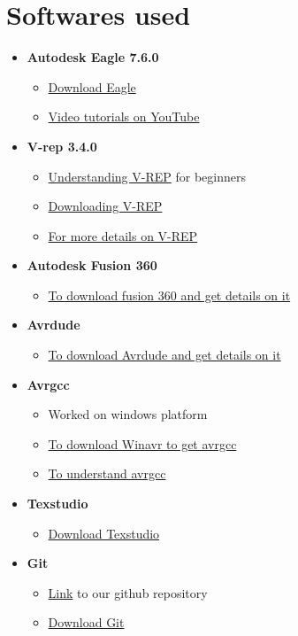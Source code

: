 \documentclass[a4paper,12pt,oneside]{book}
\begin{document}
\chapter[Softwares used]{Softwares used}
\begin{itemize}
	\item \textbf{Autodesk Eagle 7.6.0}
	\begin{itemize}
		\item \href{https://www.autodesk.com/products/eagle/overview}{Download Eagle}
		\item \href{https://www.youtube.com/user/EAGLECadSoftComputer}{Video tutorials on YouTube}
	\end{itemize}
  \item \textbf{V-rep 3.4.0}
  \begin{itemize}
  	\item \href{https://github.com/eYSIP-2017/eYSIP-2017_DistributedRobotics/blob/master/Documents/Manuals/Understanding_V_REP.pdf}{Understanding V-REP} for beginners
  	\item  \href{http://www.coppeliarobotics.com/downloads.html}{Downloading V-REP}
	\item  \href{http://www.coppeliarobotics.com/resources.html}{For more details on V-REP}
  \end{itemize}
  \item \textbf{Autodesk Fusion 360}
\begin{itemize}
	\item \href{https://www.autodesk.com/products/fusion-360/students-teachers-educators}{To download fusion 360 and get details on it}
\end{itemize}
  \item \textbf{Avrdude}
  \begin{itemize}
  	\item \href{http://www.nongnu.org/avrdude/}{To download Avrdude and get details on it}
  \end{itemize}
\item \textbf{Avrgcc}
 \begin{itemize}
 	\item Worked on windows platform
	\item \href{https://sourceforge.net/projects/winavr/files/}{To download Winavr to get avrgcc}
	\item \href{https://gcc.gnu.org/wiki/avr-gcc}{To understand avrgcc}
\end{itemize}
\item \textbf{Texstudio}
\begin{itemize}
	\item \href{http://www.texstudio.org/}{Download Texstudio}
\end{itemize}
\item \textbf{Git}
\begin{itemize}
	\item \href{https://github.com/eYSIP-2017/eYSIP-2017_DistributedRobotics.git}{Link} to our github repository
	\item \href{https://git-scm.com/}{Download Git}
\end{itemize}
\end{itemize}
\end{document}
